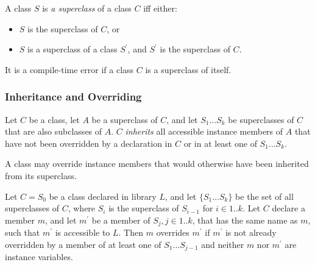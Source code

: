 \documentclass{article}
\begin{document}
\LMHash{}
A class $S$ is {\em a superclass} of a class $C$ if{}f either:
\begin{itemize}
\item $S$ is the superclass of $C$, or
\item $S$ is a superclass of a class $S^{\prime}$,
and $S^{\prime}$ is the superclass of $C$.
\end{itemize}

\LMHash{}
It is a compile-time error if a class $C$ is a superclass of itself.


\subsubsection{Inheritance and Overriding}


\LMHash{}
Let $C$ be a class,  let $A$ be a superclass of $C$, and let  $S_1 \ldots S_k$ be superclasses of $C$ that are also subclasses of $A$. $C$ {\em inherits} all accessible instance  members of  $A$ that have not been overridden by a declaration in $C$ or in at least one of $S_1 \ldots S_k$.


\LMHash{}
A class may override instance members that would otherwise have been inherited from its superclass.

\LMHash{}
Let $C = S_0$ be a class declared in library $L$, and let $\{S_1 \ldots S_k\}$ be the set of all superclasses of $C$, where $S_i$ is the superclass of $S_{i-1}$ for $i \in 1 .. k$.
Let $C$ declare a member $m$, and let  $m^\prime$ be a member of $S_j, j  \in 1 .. k$,  that has the same name as $m$, such that $m^\prime$ is accessible to $L$.
Then $m$ overrides $m^\prime$ if $m^\prime$ is not already overridden by a member of at least one of $S_1 \ldots S_{j-1}$ and neither $m$ nor $m^\prime$ are instance variables.

\end{document}

